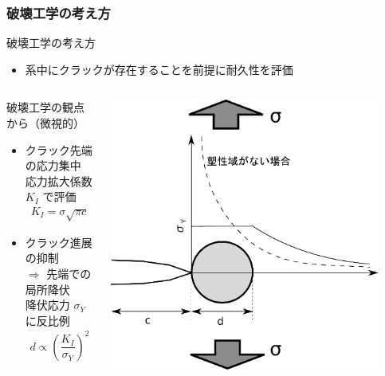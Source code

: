 \documentclass[12pt, dvipdfmx]{beamer}
\begin{document}
\begin{frame}
    \frametitle{破壊工学の考え方}
    \begin{exampleblock}{破壊工学の考え方}
    
    \begin{itemize}
    \item
    系中に\alert{クラックが存在することを前提}に耐久性を評価
    \end{itemize}
    \end{exampleblock}
    \begin{columns}[totalwidth=1\textwidth]
    \begin{alertblock}{破壊工学の観点から（微視的）}
        \begin{itemize}
            \item
            クラック先端の応力集中\\ \alert{応力拡大係数 $K_I$ で評価}
            \footnotesize
            \begin{align*}
            K_{I} = \sigma \sqrt{\pi c}
            \end{align*}
            \normalsize
            \item 
            クラック進展の抑制 \\
            $\Rightarrow$ 先端での\alert{局所降伏}\\
            降伏応力 $\sigma_Y$ に反比例
            \footnotesize
            \begin{align*}
            d \propto \left( \dfrac{K_I}{\sigma_Y} \right)^2
            \end{align*}
            \normalsize
        \end{itemize}
    \end{alertblock}
        \centering
        \includegraphics[width=0.9\textwidth]{./Crack_Yield.pdf}
    \end{columns}
\end{frame}
\end{document}
